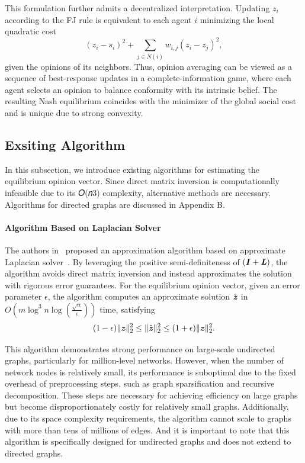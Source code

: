 This formulation further admits a decentralized interpretation.
Updating $z_i$ according to the FJ rule is equivalent to each agent $i$
minimizing the local quadratic cost
\begin{equation}
	\label{eq:local-cost}
	(z_i - s_i)^2 + \sum_{j \in N(i)} w_{i,j} (z_i - z_j)^2 ,
\end{equation}
given the opinions of its neighbors.
Thus, opinion averaging can be viewed as a sequence of best-response updates in a complete-information game, where each agent selects an opinion to balance
conformity with its intrinsic belief.
The resulting Nash equilibrium coincides with the minimizer of the global social cost and is unique due to strong convexity.


\subsection{Exsiting Algorithm} 
  In this subsection, we introduce existing algorithms for estimating the equilibrium opinion vector. Since direct matrix inversion is
  computationally infeasible due to its 𝑂(𝑛3) complexity, alternative
  methods are necessary. Algorithms for directed graphs are discussed
  in Appendix B.
  \paragraph{Algorithm Based on Laplacian Solver}
  
  The authors in~\cite{xu2021fast} proposed an approximation algorithm based on approximate Laplacian solver~\cite{kyng2016approximate}. By leveraging the positive semi-definiteness of $(\boldsymbol{\mathit{I}} + \boldsymbol{\mathit{L}})$, the algorithm avoids direct matrix inversion and instead approximates the solution with rigorous error guarantees. For the equilibrium opinion vector, given an error parameter $\epsilon$, the algorithm computes an approximate solution $\hat{\boldsymbol{\mathit{z}}}$ in $O\left(m \log^3 n \log\left(\frac{\sqrt{n}}{\epsilon}\right)\right)$ time, satisfying
  \begin{equation*}
  	(1 - \epsilon) \|\boldsymbol{\mathit{z}} \|_2^2 \le \|\hat{\boldsymbol{\mathit{z}}}\|^2_2 \leq (1 + \epsilon) \|\boldsymbol{\mathit{z}} \|_2^2.
  \end{equation*}
  
  This algorithm demonstrates strong performance on large-scale undirected graphs, particularly for million-level networks. However, when the number of network nodes is relatively small, its performance is suboptimal due to the fixed overhead of preprocessing steps, such as graph sparsification and recursive decomposition. These steps are necessary for achieving efficiency on large graphs but become disproportionately costly for relatively small graphs. Additionally, due to its space complexity requirements, the algorithm cannot scale to graphs with more than tens of millions of edges. And it is important to note that this algorithm is specifically designed for undirected graphs and does not extend to directed graphs.